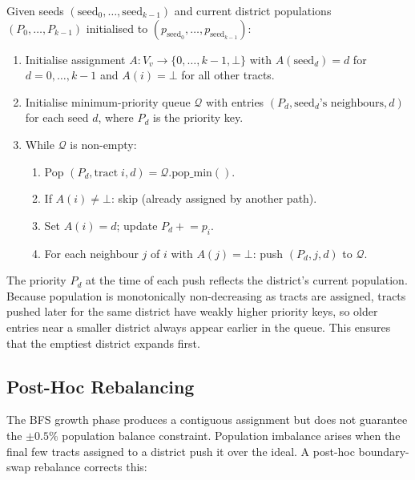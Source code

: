 \begin{definition}
\label{def:growth}
Given seeds $(\mathrm{seed}_0, \ldots, \mathrm{seed}_{k-1})$
and current district populations $(P_0, \ldots, P_{k-1})$ initialised to
$(p_{\mathrm{seed}_0}, \ldots, p_{\mathrm{seed}_{k-1}})$:
\begin{enumerate}
\item Initialise assignment $A: V_v \to \{0, \ldots, k-1, \bot\}$ with
  $A(\mathrm{seed}_d) = d$ for $d = 0, \ldots, k-1$ and $A(i) = \bot$
  for all other tracts.

\item Initialise minimum-priority queue $\mathcal{Q}$ with entries
  $(P_d, \mathrm{seed}_d\text{'s neighbours}, d)$ for each seed $d$,
  where $P_d$ is the priority key.

\item While $\mathcal{Q}$ is non-empty:
  \begin{enumerate}
  \item Pop $(P_d, \mathrm{tract}\; i, d) = \mathcal{Q}.\mathrm{pop\_min}()$.
  \item If $A(i) \neq \bot$: skip (already assigned by another path).
  \item Set $A(i) = d$; update $P_d \mathrel{+}= p_i$.
  \item For each neighbour $j$ of $i$ with $A(j) = \bot$:
    push $(P_d, j, d)$ to $\mathcal{Q}$.
  \end{enumerate}
\end{enumerate}
\end{definition}

The priority $P_d$ at the time of each push reflects the district's current
population.
Because population is monotonically non-decreasing as tracts are assigned,
tracts pushed later for the same district have weakly higher priority keys,
so older entries near a smaller district always appear earlier in the
queue.
This ensures that the emptiest district expands first.

\subsection{Post-Hoc Rebalancing}

The BFS growth phase produces a contiguous assignment but does not
guarantee the $\pm 0.5\%$ population balance constraint.
Population imbalance arises when the final few tracts assigned to a
district push it over the ideal.
A post-hoc boundary-swap rebalance corrects this:


